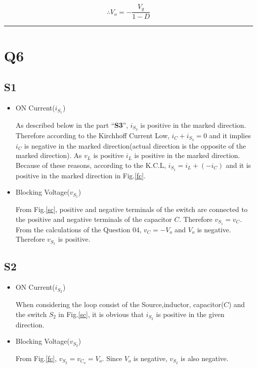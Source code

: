 \documentclass[a4paper,11pt]{article}%
\begin{document}
\[\therefore V_o = -\frac{V_g}{1-D}\]

\hrule
\section*{Q6}


\subsection*{S1}
\begin{itemize}
	\item ON Current($i_{S_1}$)	
	
	As described below in the part ``\textbf{S3}'', $i_{S_3}$ is positive in the marked direction. Therefore according to the Kirchhoff Current Low, $i_C + i_{S_3} = 0$ and it implies $i_C$ is negative in the marked direction(actual direction is the opposite of the marked direction). As $v_L$ is positive $i_L$ is positive in the marked direction. Because of these reasons, according to the K.C.L, $i_{S_1} = i_L+(-i_C)$ and it is positive in the marked direction in Fig.\ref{fc}.
	
	
	\item Blocking Voltage($v_{S_1}$)
	
	From Fig.\ref{sc}, positive and negative terminals of the switch are connected to the positive and negative terminals of the capacitor $C$. Therefore $v_{S_1} = v_C$. 	From the calculations of the  Question 04, $v_C = -V_o$ and $V_o$ is negative. Therefore $v_{S_1}$ is positive.
	
\end{itemize}


\subsection*{S2}
\begin{itemize}
	\item ON Current($i_{S_2}$)	
	
 When considering the loop consist of the Source,inductor, capacitor($C$) and the switch $S_2$ in Fig.\ref{sc}, it is obvious that $i_{S_2}$ is positive in the given direction.
	
	
	
	\item Blocking Voltage($v_{S_2}$)
	
	From Fig.\ref{fc}, $v_{S_2} = v_{C_o} = V_o $. Since $V_o$ is negative, $v_{S_2}$ is also negative.
\end{itemize}
\end{document}

